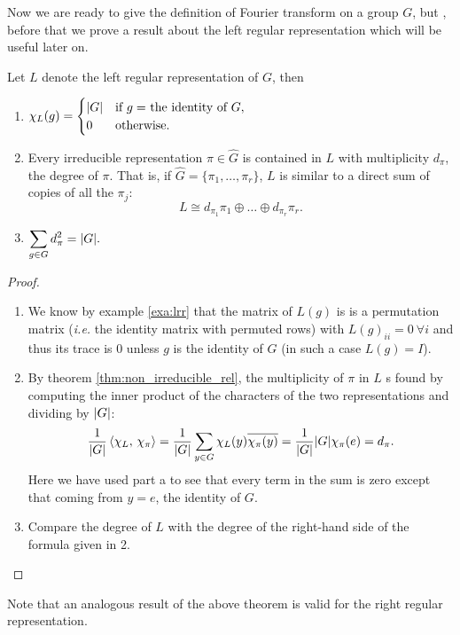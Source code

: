 Now we are ready to give the definition of Fourier transform on a group $G$, but , before that we prove a result about the left regular representation which will be useful later on.
\begin{lemma}
Let $L$ denote the left regular representation of $G$, then
\begin{enumerate}
\item $\displaystyle
\chi_{L}(g)=
\begin{cases}
\lvert G\rvert &\text{if $g=$ the identity of $G$},\\
0	   &\text{otherwise}.
\end{cases}
$
\item Every irreducible representation $\pi \in \hat{G}$ is contained in $L$ with multiplicity $d_\pi$, the degree of $\pi$. That is, if $\hat{G}=\{\pi_1,\dots ,\pi_r\}$, $L$ is similar to a direct sum of copies of all the  $\pi_j$:
\[
L\cong d_{\pi_1}\pi_1\oplus\dots\oplus d_{\pi_r}\pi_r.
\]
\item $\displaystyle\sum_{g\in G}d_{\pi}^2=\lvert G\rvert.$	
\end{enumerate}
\end{lemma}  
\begin{proof}
\begin{enumerate}
\item We know by example \ref{exa:lrr} that the matrix of $L(g)$ is  is a permutation matrix (\emph{i.e.} the identity matrix with permuted rows) with $L(g)_{ii}=0 \ \forall i$ and thus its trace is 0 unless $g$ is the identity of $G$ (in such a case $L(g)=I$).
\item By theorem \ref{thm:non_irreducible_rel}, the multiplicity of $\pi$ in $L$ s found by computing the inner product  of  the  characters  of  the  two  representations  and  dividing  by $\lvert G\rvert$:
\[
\frac{1}{\lvert G\rvert}\braket{\chi_L,\, \chi_\pi}=\frac{1}{\lvert G\rvert}\sum_{y \in G}\chi_L(y) \overline{\chi_\pi(y)}=\frac{1}{\lvert G\rvert}\lvert G\rvert \chi_\pi(e)=d_\pi.
\]
Here  we have used  part  a to  see that  every  term  in  the  sum is  zero  except
that coming from $y=e$, the identity of $G$.
\item Compare the degree of $L$ with the degree of the right-hand side of the formula given in 2.
 

\end{enumerate}
\end{proof}
Note that an analogous result of the above theorem is valid for the right regular representation.
